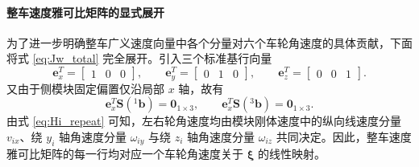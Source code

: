 \paragraph{整车速度雅可比矩阵的显式展开}

为了进一步明确整车广义速度向量中各个分量对六个车轮角速度的具体贡献，下面将式 \eqref{eq:Jw_total} 完全展开。引入三个标准基行向量
\begin{equation}
\mathbf e_x^T=
\begin{bmatrix}
1 & 0 & 0
\end{bmatrix},
\qquad
\mathbf e_y^T=
\begin{bmatrix}
0 & 1 & 0
\end{bmatrix},
\qquad
\mathbf e_z^T=
\begin{bmatrix}
0 & 0 & 1
\end{bmatrix}.
\label{eq:unit_row_vectors}
\end{equation}
又由于侧模块固定偏置仅沿局部 $x$ 轴，故有
\begin{equation}
\mathbf e_x^T\mathbf S({}^{1}\mathbf b)=\mathbf 0_{1\times 3},
\qquad
\mathbf e_x^T\mathbf S({}^{3}\mathbf b)=\mathbf 0_{1\times 3}.
\label{eq:ex_skew_b_zero}
\end{equation}
由式 \eqref{eq:Hi_repeat} 可知，左右轮角速度均由模块刚体速度中的纵向线速度分量 $v_{ix}$、绕 $y_i$ 轴角速度分量 $\omega_{iy}$ 与绕 $z_i$ 轴角速度分量 $\omega_{iz}$ 共同决定。因此，整车速度雅可比矩阵的每一行均对应一个车轮角速度关于 $\boldsymbol\xi$ 的线性映射。

